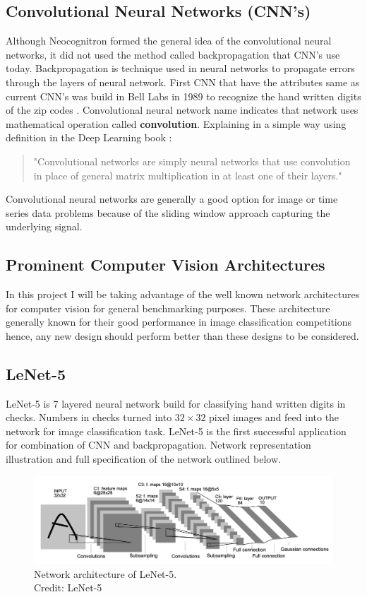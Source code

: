 \documentclass[12pt, twoside, a4paper]{article}
\begin{document}
\subsection{Convolutional Neural Networks (CNN's)}
Although Neocognitron formed the general idea of the convolutional neural networks, it did not used the method called backpropagation that CNN's use today. Backpropagation is technique used in neural networks to propagate errors through the layers of neural network. First CNN that have the attributes same as current CNN's was build in Bell Labs in 1989 to recognize the hand written digits of the zip codes \cite{cnnzipcodes}. Convolutional neural network name indicates that network uses mathematical operation called \textbf{convolution}. Explaining in a simple way using definition in the Deep Learning book \cite{deeplearningbook}:

\begin{quote}
    "Convolutional networks are simply neural networks that use convolution in place of general matrix multiplication in at least one of their layers."
\end{quote}

Convolutional neural networks are generally a good option for image or time series data problems because of the sliding window approach capturing the underlying signal.

\subsection{Prominent Computer Vision Architectures}
In this project I will be taking advantage of the well known network architectures for computer vision for general benchmarking purposes. These architecture generally known for their good performance in image classification competitions hence, any new design should perform better than these designs to be considered. 

\subsection{LeNet-5}
LeNet-5 \cite{Lenet5} is 7 layered neural network build for classifying hand written digits in checks. Numbers in checks turned into  $32 \times 32$ pixel images and feed into the network for image classification task. LeNet-5 is the first successful application for combination of CNN and backpropagation. Network representation illustration and full specification of the network outlined below.

\begin{figure}[H]%
    \centering
    \includegraphics[width=\textwidth]{img/lenet-5.png}%
    \caption{Network architecture of LeNet-5.\\Credit: LeNet-5 \cite{Lenet5}}%
    \label{fig:lenet5}%
\end{figure}
\end{document}
